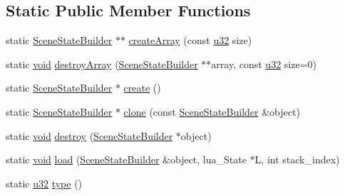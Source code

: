 \subsection*{Static Public Member Functions}
\begin{DoxyCompactItemize}
\item 
static \mbox{\hyperlink{classnjli_1_1_scene_state_builder}{Scene\+State\+Builder}} $\ast$$\ast$ \mbox{\hyperlink{classnjli_1_1_scene_state_builder_aef4178bb85949d3adf270ac0e4e9584b}{create\+Array}} (const \mbox{\hyperlink{_util_8h_a10e94b422ef0c20dcdec20d31a1f5049}{u32}} size)
\item 
static \mbox{\hyperlink{_thread_8h_af1e856da2e658414cb2456cb6f7ebc66}{void}} \mbox{\hyperlink{classnjli_1_1_scene_state_builder_ae519e8d5d3a7d5c581a867a5495b58b9}{destroy\+Array}} (\mbox{\hyperlink{classnjli_1_1_scene_state_builder}{Scene\+State\+Builder}} $\ast$$\ast$array, const \mbox{\hyperlink{_util_8h_a10e94b422ef0c20dcdec20d31a1f5049}{u32}} size=0)
\item 
static \mbox{\hyperlink{classnjli_1_1_scene_state_builder}{Scene\+State\+Builder}} $\ast$ \mbox{\hyperlink{classnjli_1_1_scene_state_builder_ae0807229954ee519c875880eb7a2f69d}{create}} ()
\item 
static \mbox{\hyperlink{classnjli_1_1_scene_state_builder}{Scene\+State\+Builder}} $\ast$ \mbox{\hyperlink{classnjli_1_1_scene_state_builder_af4e8a8b91ef4203267d43831379c09c1}{clone}} (const \mbox{\hyperlink{classnjli_1_1_scene_state_builder}{Scene\+State\+Builder}} \&object)
\item 
static \mbox{\hyperlink{_thread_8h_af1e856da2e658414cb2456cb6f7ebc66}{void}} \mbox{\hyperlink{classnjli_1_1_scene_state_builder_a02708b50e5123587ea6ec3282900373b}{destroy}} (\mbox{\hyperlink{classnjli_1_1_scene_state_builder}{Scene\+State\+Builder}} $\ast$object)
\item 
static \mbox{\hyperlink{_thread_8h_af1e856da2e658414cb2456cb6f7ebc66}{void}} \mbox{\hyperlink{classnjli_1_1_scene_state_builder_af8d7b429f1265290225f47bd036cd9b5}{load}} (\mbox{\hyperlink{classnjli_1_1_scene_state_builder}{Scene\+State\+Builder}} \&object, lua\+\_\+\+State $\ast$L, int stack\+\_\+index)
\item 
static \mbox{\hyperlink{_util_8h_a10e94b422ef0c20dcdec20d31a1f5049}{u32}} \mbox{\hyperlink{classnjli_1_1_scene_state_builder_aa964a5f9761378d3a65c4a826f1edde2}{type}} ()
\end{DoxyCompactItemize}
